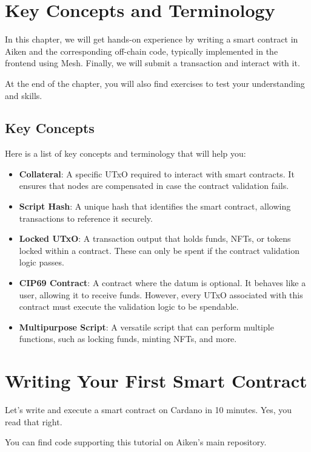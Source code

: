\section{Key Concepts and Terminology}

In this chapter, we will get hands-on experience by writing a smart contract in Aiken and the corresponding off-chain code, typically implemented in the frontend using Mesh. Finally, we will submit a transaction and interact with it.

At the end of the chapter, you will also find exercises to test your understanding and skills.

\subsection{Key Concepts}

Here is a list of key concepts and terminology that will help you:

\begin{itemize}
    \item \textbf{Collateral}: A specific UTxO required to interact with smart contracts. It ensures that nodes are compensated in case the contract validation fails.
    \item \textbf{Script Hash}: A unique hash that identifies the smart contract, allowing transactions to reference it securely.
    \item \textbf{Locked UTxO}: A transaction output that holds funds, NFTs, or tokens locked within a contract. These can only be spent if the contract validation logic passes.
    \item \textbf{CIP69 Contract}: A contract where the datum is optional. It behaves like a user, allowing it to receive funds. However, every UTxO associated with this contract must execute the validation logic to be spendable.
    \item \textbf{Multipurpose Script}: A versatile script that can perform multiple functions, such as locking funds, minting NFTs, and more.
\end{itemize}


\section{Writing Your First Smart Contract}

Let's write and execute a smart contract on Cardano in 10 minutes. Yes, you read that right.

You can find code supporting this tutorial on Aiken's main repository.

